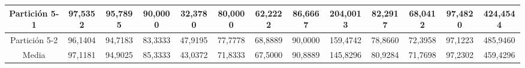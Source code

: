 \documentclass[12pt]{article}
\begin{document}
\begin{table}[H]
{\begin{tabular}{|c|cccc|cccc|cccc|}
Partición 5-1 & \multicolumn{1}{c|}{97,5352}                                                  & \multicolumn{1}{c|}{95,7895}                                                 & \multicolumn{1}{c|}{90,0000} & 32,3780 & \multicolumn{1}{c|}{80,0000}                                                  & \multicolumn{1}{c|}{62,2222}                                                 & \multicolumn{1}{c|}{86,6667} & 204,0013 & \multicolumn{1}{c|}{82,2917}                                                  & \multicolumn{1}{c|}{68,0412}                                                 & \multicolumn{1}{c|}{97,4820} & 424,4544 \\ \hline
Partición 5-2 & \multicolumn{1}{c|}{96,1404}                                                  & \multicolumn{1}{c|}{94,7183}                                                 & \multicolumn{1}{c|}{83,3333} & 47,9195 & \multicolumn{1}{c|}{77,7778}                                                  & \multicolumn{1}{c|}{68,8889}                                                 & \multicolumn{1}{c|}{90,0000} & 159,4742 & \multicolumn{1}{c|}{78,8660}                                                  & \multicolumn{1}{c|}{72,3958}                                                 & \multicolumn{1}{c|}{97,1223} & 485,9460 \\ \hline
Media         & \multicolumn{1}{c|}{97,1181}                                                  & \multicolumn{1}{c|}{94,9025}                                                 & \multicolumn{1}{c|}{85,3333} & 43,0372 & \multicolumn{1}{c|}{71,8333}                                                  & \multicolumn{1}{c|}{67,5000}                                                 & \multicolumn{1}{c|}{90,8889} & 145,8296 & \multicolumn{1}{c|}{80,9284}                                                  & \multicolumn{1}{c|}{71,7698}                                                 & \multicolumn{1}{c|}{97,2302} & 459,4296 \\ \hline
\end{tabular}}
\end{table}
\end{document}
